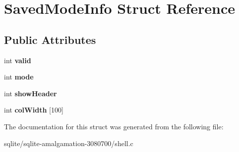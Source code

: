 \hypertarget{struct_saved_mode_info}{\section{Saved\+Mode\+Info Struct Reference}
\label{struct_saved_mode_info}
}
\subsection*{Public Attributes}
\begin{DoxyCompactItemize}
\item 
\hypertarget{struct_saved_mode_info_a43e863fb285c2aad913087572ebd5e27}{int {\bfseries valid}}\label{struct_saved_mode_info_a43e863fb285c2aad913087572ebd5e27}

\item 
\hypertarget{struct_saved_mode_info_ab6d30b28565d51ca017904f70b5edac6}{int {\bfseries mode}}\label{struct_saved_mode_info_ab6d30b28565d51ca017904f70b5edac6}

\item 
\hypertarget{struct_saved_mode_info_a73fa5b451f94fa75fb5e27887831b8f4}{int {\bfseries show\+Header}}\label{struct_saved_mode_info_a73fa5b451f94fa75fb5e27887831b8f4}

\item 
\hypertarget{struct_saved_mode_info_add96e86a9293b5e1bfd3ab92bf1a365f}{int {\bfseries col\+Width} \mbox{[}100\mbox{]}}\label{struct_saved_mode_info_add96e86a9293b5e1bfd3ab92bf1a365f}

\end{DoxyCompactItemize}


The documentation for this struct was generated from the following file\+:\begin{DoxyCompactItemize}
\item 
sqlite/sqlite-\/amalgamation-\/3080700/shell.\+c\end{DoxyCompactItemize}
